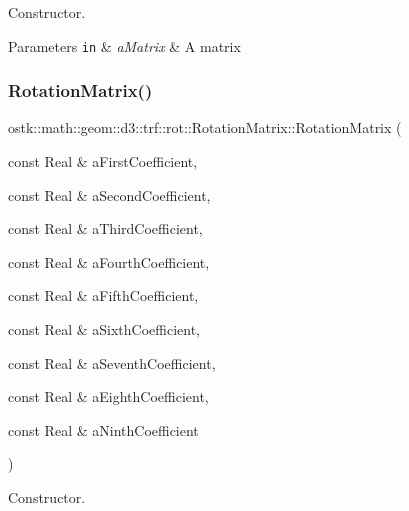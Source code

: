 Constructor. 


\begin{DoxyParams}[1]{Parameters}
\mbox{\tt in}  & {\em a\+Matrix} & A matrix \\
\hline
\end{DoxyParams}
\mbox{\label{classostk_1_1math_1_1geom_1_1d3_1_1trf_1_1rot_1_1_rotation_matrix_ab82d268cc206957afae273a4fe5cc265}} 
\subsubsection{\texorpdfstring{Rotation\+Matrix()}{RotationMatrix()}\hspace{0.1cm}{\footnotesize\ttfamily [2/2]}}
{\footnotesize\ttfamily ostk\+::math\+::geom\+::d3\+::trf\+::rot\+::\+Rotation\+Matrix\+::\+Rotation\+Matrix (\begin{DoxyParamCaption}\item[{const Real \&}]{a\+First\+Coefficient,  }\item[{const Real \&}]{a\+Second\+Coefficient,  }\item[{const Real \&}]{a\+Third\+Coefficient,  }\item[{const Real \&}]{a\+Fourth\+Coefficient,  }\item[{const Real \&}]{a\+Fifth\+Coefficient,  }\item[{const Real \&}]{a\+Sixth\+Coefficient,  }\item[{const Real \&}]{a\+Seventh\+Coefficient,  }\item[{const Real \&}]{a\+Eighth\+Coefficient,  }\item[{const Real \&}]{a\+Ninth\+Coefficient }\end{DoxyParamCaption})}



Constructor. 


